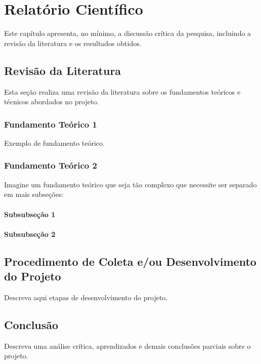 \chapter{Relatório Científico}

Este capítulo apresenta, no mínimo, a discussão crítica da pesquisa, incluindo a revisão da literatura e os resultados obtidos.

\section{Revisão da Literatura}

Esta seção realiza uma revisão da literatura sobre os fundamentos teóricos e técnicos abordados no projeto.

\subsection{Fundamento Teórico 1}

Exemplo de fundamento teórico.

\subsection{Fundamento Teórico 2}

Imagine um fundamento teórico que seja tão complexo que necessite ser separado em mais subseções:

\subsubsection{Subsubseção 1}

\subsubsection{Subsubseção 2}

\section{Procedimento de Coleta e/ou Desenvolvimento do Projeto}

Descreva aqui etapas de desenvolvimento do projeto.

\section{Conclusão}

Descreva uma análise crítica, aprendizados e demais conclusões parciais sobre o projeto.

